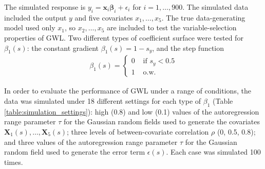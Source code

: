\documentclass[authoryear, review, 11pt]{elsarticle}
\begin{document}
		The simulated response is $y_i = \bm{x}_i \bm{\beta}_i + \epsilon_i$ for $i=1, \dots, 900$. The simulated data included the output $y$ and five covariates $x_1, \dots, x_5$. The true data-generating model used only $x_1$, so $x_2, \dots, x_5$ are included to test the variable-selection properties of GWL. Two different types of coefficient surface were tested for $\beta_1(s)$: the constant gradient $\beta_1(s) = 1-s_y$, and the step function
		\begin{eqnarray}
			\beta_1(s) = \begin{cases} 0 &\mbox{ if } s_y<0.5 \\ 1 &\mbox{ o.w.} \end{cases}
		\end{eqnarray}
		
		In order to evaluate the performance of GWL under a range of conditions, the data was simulated under 18 different settings for each type of $\beta_1$ (Table \ref{table:simulation_settings}): high (0.8) and low (0.1) values of the autoregression range parameter $\tau$ for the Gaussian random fields used to generate the covariates $\bm{X}_1(s), \dots, \bm{X}_5(s)$; three levels of between-covariate correlation $\rho$ (0, 0.5, 0.8); and three values of the autoregression range parameter $\tau$ for the Gaussian random field used to generate the error term $\epsilon(s)$. Each case was simulated 100 times.\\
		
\end{document}
